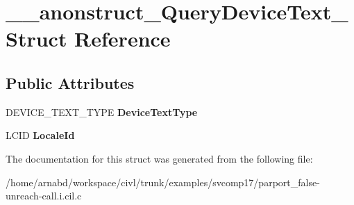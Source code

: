 \hypertarget{struct____anonstruct__QueryDeviceText__77}{}\section{\+\_\+\+\_\+anonstruct\+\_\+\+Query\+Device\+Text\+\_ Struct Reference}
\label{struct____anonstruct__QueryDeviceText__77}
\subsection*{Public Attributes}
\begin{DoxyCompactItemize}
\item 
\hypertarget{struct____anonstruct__QueryDeviceText__77_ae7d231dd828df4b91ccbd3d349ce9cae}{}D\+E\+V\+I\+C\+E\+\_\+\+T\+E\+X\+T\+\_\+\+T\+Y\+P\+E {\bfseries Device\+Text\+Type}\label{struct____anonstruct__QueryDeviceText__77_ae7d231dd828df4b91ccbd3d349ce9cae}

\item 
\hypertarget{struct____anonstruct__QueryDeviceText__77_ae172a923e97c73a0e754ef4ffd2d1086}{}L\+C\+I\+D {\bfseries Locale\+Id}\label{struct____anonstruct__QueryDeviceText__77_ae172a923e97c73a0e754ef4ffd2d1086}

\end{DoxyCompactItemize}


The documentation for this struct was generated from the following file\+:\begin{DoxyCompactItemize}
\item 
/home/arnabd/workspace/civl/trunk/examples/svcomp17/parport\+\_\+false-\/unreach-\/call.\+i.\+cil.\+c\end{DoxyCompactItemize}
